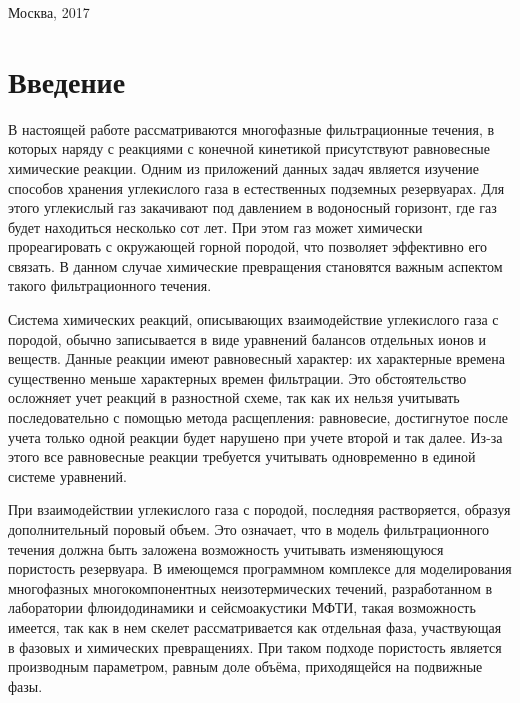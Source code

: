 \documentclass[14pt,a4paper]{extarticle}
\begin{document}
\vfill

\begin{center}
	Москва, 2017
\end{center}

\onehalfspacing

\restoregeometry

\clearpage
\tableofcontents
\clearpage

\section*{Введение}

В настоящей работе рассматриваются многофазные фильтрационные течения, в которых наряду с реакциями с конечной кинетикой присутствуют равновесные химические реакции. Одним из приложений данных задач является изучение способов хранения углекислого газа в естественных подземных резервуарах. Для этого углекислый газ закачивают под давлением в водоносный горизонт, где газ будет находиться несколько сот лет. При этом газ может химически прореагировать с окружающей горной породой, что позволяет эффективно его связать. В данном случае химические превращения становятся важным аспектом такого фильтрационного течения.

Система химических реакций, описывающих взаимодействие углекислого газа с породой, обычно записывается в виде уравнений балансов отдельных ионов и веществ. Данные реакции имеют равновесный характер: их характерные времена  существенно меньше характерных времен фильтрации. Это обстоятельство осложняет учет реакций в разностной схеме, так как их нельзя учитывать последовательно с помощью метода расщепления: равновесие, достигнутое после учета только одной реакции будет нарушено при учете второй и так далее. Из-за этого все равновесные реакции требуется учитывать одновременно в единой системе уравнений.

При взаимодействии углекислого газа с породой, последняя растворяется, образуя дополнительный поровый объем. Это означает, что в модель фильтрационного течения должна быть заложена возможность учитывать изменяющуюся пористость резервуара. В имеющемся программном комплексе для моделирования многофазных многокомпонентных неизотермических течений, разработанном в лаборатории флюидодинамики и сейсмоакустики МФТИ, такая возможность имеется, так как в нем скелет рассматривается как отдельная фаза, участвующая в фазовых и химических превращениях. При таком подходе пористость является производным параметром, равным доле объёма, приходящейся на подвижные фазы.
\end{document}
